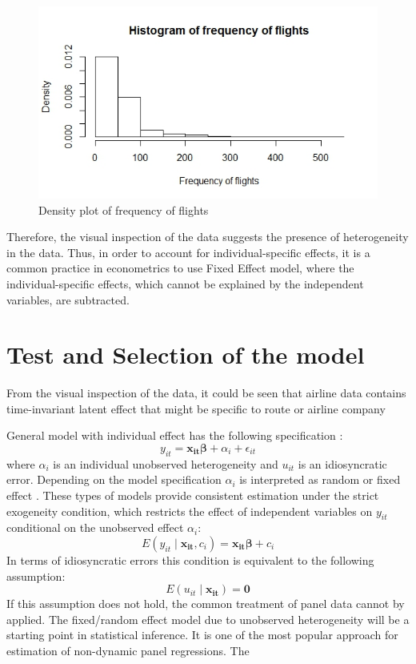 \documentclass[titlepage, 11pt]{article}
\begin{document}
\begin{figure}[ht!]
\centering
\caption{Density plot of frequency of flights}
\label{density}
\includegraphics[scale = 0.5]{hist.jpeg}
\end{figure}

\tab Therefore, the visual inspection of the data suggests the presence of heterogeneity in the data. Thus, in order to account for individual-specific effects, it is a common practice in econometrics to use Fixed Effect model, where the individual-specific effects, which cannot be explained by the independent variables, are subtracted. 
\section{Test and Selection of the model}
From the visual inspection of the data, it could be seen that airline data contains time-invariant latent effect that might be specific to route or airline company

General model with individual effect has the following specification \cite{book}: 
\begin{equation} \label{eq:2}
y_{it} = \boldsymbol{x_{it}\beta}  + \alpha_i+ \epsilon_{it} 
\end{equation}
where $\alpha_i$ is an individual unobserved heterogeneity and $u_{it}$ is an idiosyncratic error. Depending on the model specification $\alpha_i$ is interpreted as random or fixed effect \cite{book}. These types of models provide consistent estimation under the strict exogeneity condition, which restricts the effect of independent variables on $y_{it}$ conditional on the unobserved effect $\alpha_i$: 
\begin{equation} \label{eq:3}
E(y_{it}\mid\boldsymbol{x_{it}}, c_i)=\boldsymbol{x_{it}\beta} +c_i
\end{equation}
In terms of idiosyncratic errors this condition is equivalent to the following assumption: 
\begin{equation} \label{eq:4}
E(u_{it}\mid\boldsymbol{x_{it}})=\boldsymbol{0}
\end{equation}
If this assumption does not hold, the common treatment of panel data cannot by applied. The fixed/random effect model due to unobserved heterogeneity will be a starting point in statistical inference. It is one of the most popular approach for estimation of non-dynamic panel regressions. The 
\end{document}
